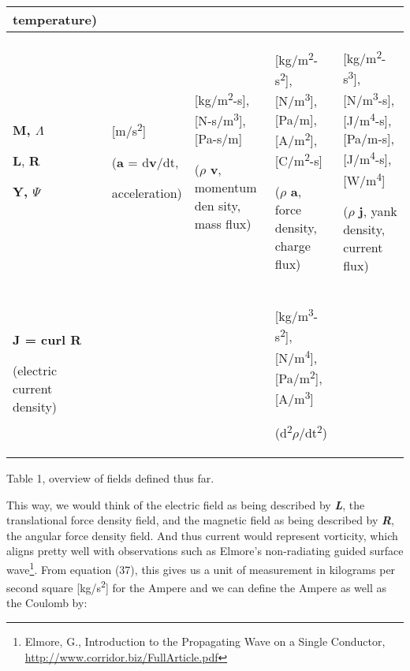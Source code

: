 \documentclass[a4paper]{article}
\newcommand\textstyleNone[1]{#1}
\begin{document}
\begin{flushleft}
\begin{supertabular}{|m{1.737cm}|m{1.763cm}|m{3.698cm}|m{3.7cm}|m{4.0090003cm}|}
temperature)\\\hline
\textbf{M, $\Lambda $}

\textbf{L}, \textbf{R}

{\bfseries Y, $\Psi $} &
[m/s\textsuperscript{2}]  

(\textbf{a} = d\textbf{v}/dt,

acceleration) &
[kg/m\textsuperscript{2}{}-s], [N-s/m\textsuperscript{3}], [Pa-s/m]  

($\rho $ \textbf{v}, momentum den sity, mass flux) &
[kg/m\textsuperscript{2}{}-s\textsuperscript{2}], [N/m\textsuperscript{3}], [Pa/m], [A/m\textsuperscript{2}],
[C/m\textsuperscript{2}{}-s]

($\rho $ \textbf{a}, force density, charge flux) &
[kg/m\textsuperscript{2}{}-s\textsuperscript{3}], [N/m\textsuperscript{3}{}-s], [J/m\textsuperscript{4}{}-s], [Pa/m-s],
[J/m\textsuperscript{4}{}-s], [W/m\textsuperscript{4}]

($\rho $ \textbf{j}, yank density, current flux)\\\hline
{\bfseries J\textmd{ = curl} R}

(electric current density) &
 &
 &
[kg/m\textsuperscript{3}{}-s\textsuperscript{2}], [N/m\textsuperscript{4}], [Pa/m\textsuperscript{2}],
[A/m\textsuperscript{3}] 

(d\textsuperscript{2}$\rho $/dt\textsuperscript{2}) &
\\\hline
\end{supertabular}
\end{flushleft}
{\raggedleft\color[rgb]{0.101960786,0.101960786,0.101960786}
\textstyleNone{Table 1, overview of fields defined thus far.}
\par}

{
\textstyleNone{{This way, we would think of the electric field as
being described by
}\textbf{\textit{{L}}}{,
the translational force density field, and the magnetic field as being described by
}\textbf{\textit{{R}}}{,
the angular force density field. And thus current would represent vorticity, which aligns pretty well with observations
such as Elmore's non-radiating guided surface wave}}\footnote{ Elmore, G., Introduction to the Propagating Wave on a
Single Conductor, \url{http://www.corridor.biz/FullArticle.pdf}\par
}\textstyleNone{{. From equation
}{(37)}{, this
gives us a }{unit of measurement in kilograms per second square
[kg/s}{\textsuperscript{2}}{]
}{for the Ampere
}{and we can define the Ampere as well as the Coulomb by:}}}
\end{document}
